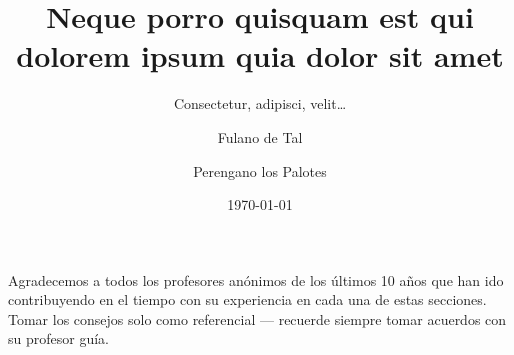\documentclass[copyright]{tesisunab}
\title{Neque porro quisquam est qui dolorem ipsum quia dolor sit amet}
\author{Fulano de Tal \and Perengano los Palotes}
\date{\today}
\subtitle{Consectetur, adipisci, velit\ldots}
\begin{document}
	\maketitle

	\frontmatter
	
	
	\begin{agradecimiento}
		Agradecemos a todos los profesores anónimos de los últimos 10 años que han ido contribuyendo en el tiempo con su experiencia en cada una de estas secciones. Tomar los consejos solo como referencial --- recuerde siempre tomar acuerdos con su profesor guía.
	\end{agradecimiento}
	
	\tableofcontents
	\newpage
	\listoftables
	\newpage
	\listoffigures
	\newpage
	
\end{document}
